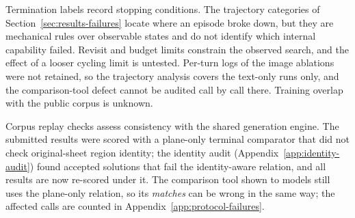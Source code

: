 Termination labels record stopping conditions. The trajectory categories of
Section~\ref{sec:results-failures} locate where an episode broke down, but they are mechanical
rules over observable states and do not identify which internal capability failed. Revisit and
budget limits constrain the observed search, and the effect of a looser cycling limit is untested.
Per-turn logs of the image ablations were not retained, so the trajectory analysis covers the
text-only runs only, and the comparison-tool defect cannot be audited call by call there.
Training overlap with the public corpus is unknown.

Corpus replay checks assess consistency with the shared generation engine. The submitted results
were scored with a plane-only terminal comparator that did not check original-sheet region
identity; the identity audit (Appendix~\ref{app:identity-audit}) found accepted solutions that
fail the identity-aware relation, and all results are now re-scored under it. The comparison
tool shown to models still uses the plane-only relation, so its \emph{matches} can be wrong in
the same way; the affected calls are counted in Appendix~\ref{app:protocol-failures}.
